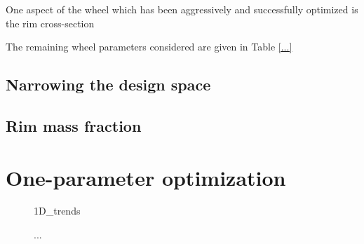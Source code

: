 \documentclass[\rootdir/thesis.tex]{subfiles}
\begin{document}
One aspect of the wheel which has been aggressively and successfully optimized is the rim cross-section


The remaining wheel parameters considered are given in Table \ref{...}



\subsection{Narrowing the design space}

\subsection{Rim mass fraction}


\section{One-parameter optimization}

\begin{figure}
\centering
{1D_trends}
\caption{...}
\label{fig:opt_1D_trends}
\end{figure}

\inprogress
\end{document}
